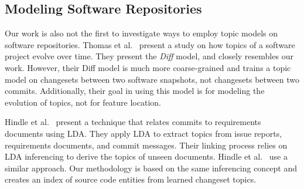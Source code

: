

\subsection{Modeling Software Repositories}

Our work is also not the first to investigate ways to employ topic models on
software repositories. Thomas et al.~\cite{Thomas-etal:2011} present a study on
how topics of a software project evolve over time. They present the \emph{Diff}
model, and closely resembles our work. However, their Diff model is much more
coarse-grained and trains a topic model on changesets between two software
snapshots, not changesets between two commits. Additionally, their goal in using
this model is for modeling the evolution of topics, not for feature location.

Hindle et al.~\cite{Hindle-etal:2009} present a technique that relates
commits to requirements documents using LDA.  They apply LDA to extract
topics from issue reports, requirements documents, and commit messages.  Their
linking process relies on LDA inferencing to derive the topics of unseen documents.
Hindle et al.~\cite{Hindle-etal:2014} use a similar approach.
Our methodology is based on the same inferencing concept and
creates an index of source code entities from learned changeset topics.
